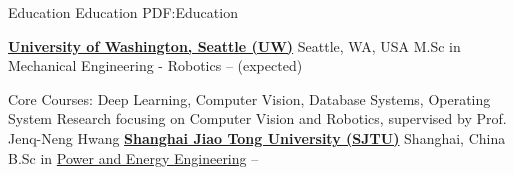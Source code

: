 \documentclass[letterpaper,MMMyyyy,nonstopmode]{simpleresumecv}
\begin{document}
\begin{Body}






\Section
{Education}
{Education}
{PDF:Education}

\Entry
\href{http://www.me.washington.edu/}
{\textbf{University of Washington, Seattle (UW)}}
\hfill Seattle, WA, USA
\Gap
\BulletItem
M.Sc in
{Mechanical Engineering - Robotics}
\hfill
{} --
 (expected)
\begin{Detail}
\end{Detail}
\BulletItem
Core Courses: Deep Learning, Computer Vision, Database Systems, Operating System
\BulletItem
Research focusing on Computer Vision and Robotics, supervised by Prof. Jenq-Neng Hwang
\Gap
\href{http://en.sjtu.edu.cn/}
{\textbf{Shanghai Jiao Tong University (SJTU)}}
\hfill Shanghai, China
\Gap
\BulletItem
B.Sc in
\href{http://202.120.53.238/English/}
{Power and Energy Engineering}
\hfill
{} --
\begin{Detail}
\end{Detail}










\end{Body}
\end{document}
